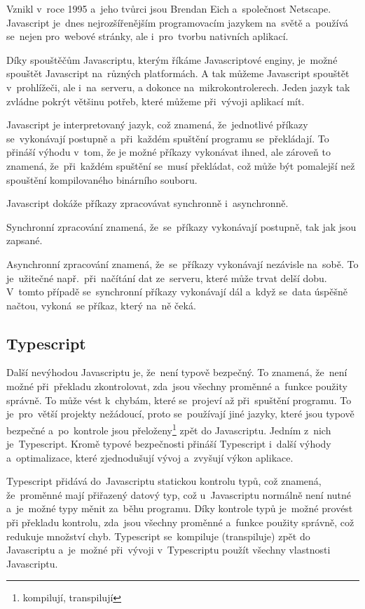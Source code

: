 \documentclass[14pt]{article}
\begin{document}
        Vznikl v~roce 1995 a~jeho tvůrci jsou Brendan Eich a~společnost Netscape.
        Javascript je~dnes nejrozšířenějším programovacím jazykem na~světě a~používá se~nejen pro~webové stránky,
        ale i~pro~tvorbu nativních aplikací.

        Díky spouštěčům Javascriptu, kterým říkáme Javascriptové enginy, je~možné spouštět Javascript na~různých platformách.
        A tak můžeme Javascript spouštět v~prohlížeči, ale i~na~serveru, a dokonce na~mikrokontrolerech. Jeden jazyk tak zvládne pokrýt
        většinu potřeb, které můžeme při~vývoji aplikací mít.

        Javascript je interpretovaný jazyk, což znamená, že~jednotlivé příkazy se~vykonávají postupně a~při~každém spuštění programu se~překládají.
        To přináší výhodu v~tom, že je možné příkazy vykonávat ihned, ale zároveň to znamená, že~při~každém spuštění se~musí překládat, což může být pomalejší než spouštění kompilovaného binárního souboru.

        Javascript dokáže příkazy zpracovávat synchronně i~asynchronně.
        
        Synchronní zpracování znamená, že~se~příkazy vykonávají postupně, tak jak
        jsou zapsané.
        
        Asynchronní zpracování znamená, že~se~příkazy vykonávají nezávisle na~sobě. To je~užitečné např.~při~načítání dat ze~serveru,
        které může trvat delší dobu. V~tomto případě se~synchronní příkazy vykonávají dál a~když se~data úspěšně načtou, vykoná~se příkaz, který na~ně čeká. \parencite{kantor_javascript}

        \subsection{Typescript}
        Další nevýhodou Javascriptu je, že~není typově bezpečný. To znamená, že~není možné při~překladu zkontrolovat, zda~jsou všechny proměnné
        a~funkce použity správně. To může vést k~chybám, které se~projeví až při~spuštění programu. To je~pro~větší projekty nežádoucí, proto se~používají
        jiné jazyky, které jsou typově bezpečné a~po~kontrole jsou přeloženy\footnote{kompilují, transpilují} zpět do Javascriptu. Jedním z~nich je~Typescript.
        Kromě typové bezpečnosti přináší Typescript i~další výhody a~optimalizace, které zjednodušují vývoj a~zvyšují výkon aplikace.

        Typescript přidává do~Javascriptu statickou kontrolu typů, což znamená, že~proměnné mají přiřazený datový typ, což
        u~Javascriptu normálně není nutné a~je~možné typy měnit za~běhu programu.
        Díky kontrole typů je~možné provést při překladu kontrolu, zda~jsou všechny proměnné a~funkce použity správně, což redukuje množství chyb.
        Typescript se~kompiluje (transpiluje) zpět do Javascriptu a~je~možné při~vývoji v~Typescriptu použít všechny vlastnosti Javascriptu.\parencite[Get started/TypeScript for the New Programmer]{TypeScript}
\end{document}
